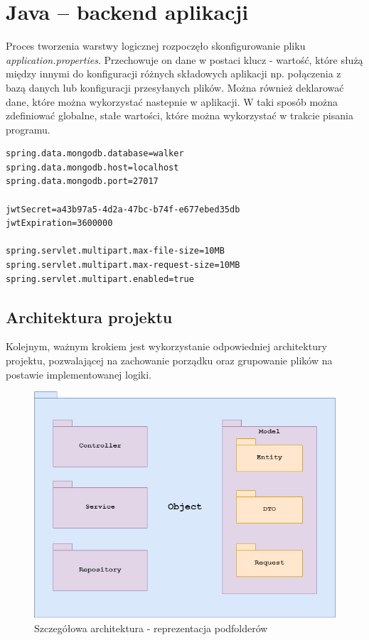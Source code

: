 \newpage
\section{Java -- backend aplikacji}
Proces tworzenia warstwy logicznej rozpoczęło skonfigurowanie pliku \textit{application.properties}. Przechowuje on dane w postaci klucz - wartość, które służą między innymi do konfiguracji różnych składowych aplikacji np. połączenia z bazą danych lub konfiguracji przesyłanych plików. Można również deklarować dane, które można wykorzystać nastepnie w aplikacji. W taki sposób można zdefiniować globalne, stałe wartości, które można wykorzystać w trakcie pisania programu.
\begin{lstlisting}
spring.data.mongodb.database=walker
spring.data.mongodb.host=localhost
spring.data.mongodb.port=27017

jwtSecret=a43b97a5-4d2a-47bc-b74f-e677ebed35db
jwtExpiration=3600000

spring.servlet.multipart.max-file-size=10MB
spring.servlet.multipart.max-request-size=10MB
spring.servlet.multipart.enabled=true
\end{lstlisting}

\subsection{Architektura projektu}
Kolejnym, ważnym krokiem jest wykorzystanie odpowiedniej architektury projektu, pozwalającej na zachowanie porządku oraz grupowanie plików na postawie implementowanej logiki.

\begin{figure}[H]
  \centering
  \includegraphics[width=1\linewidth]{rysunki/packages.png}
  \caption{Szczegółowa architektura - reprezentacja podfolderów}
  \label{fig:java-architecture-2}
\end{figure}

